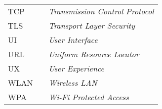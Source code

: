 \begin{table}[H]
\begin{tabular}{lll}
TCP   &  & \textit{Transmission Control Protocol}                    \\
TLS   &  & \textit{Transport Layer Security}                         \\
UI    &  & \textit{User Interface}                                   \\
URL   &  & \textit{Uniform Resource Locator}                         \\
UX    &  & \textit{User Experience}                                  \\
WLAN  &  & \textit{Wireless LAN}                                     \\
WPA   &  & \textit{Wi-Fi Protected Access}
\end{tabular}
\end{table}
